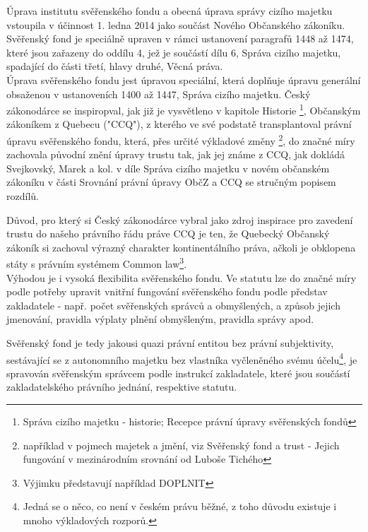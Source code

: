 \documentclass{article}
\begin{document}
Úprava institutu svěřenského fondu a obecná úprava správy cizího majetku vstoupila v účinnost 1. ledna 2014 jako součást Nového Občanského zákoníku. Svěřenský fond je speciálně upraven v rámci ustanovení paragrafů 1448 až 1474, které jsou zařazeny do oddílu 4, jež je součástí dílu 6, Správa cizího majetku, spadající do části třetí, hlavy druhé, Věcná práva. \\

Úprava svěřenského fondu jest úpravou speciální, která doplňuje úpravu generální obsaženou v ustanoveních 1400 až 1447, Správa cizího majetku. Český zákonodárce se inspiropval, jak již je vysvětleno v kapitole Historie \footnote{Správa cizího majetku - historie; Recepce právní úpravy svěřenských fondů}, Občanským zákoníkem z Quebecu ("CCQ"), z kterého ve své podstatě transplantoval právní úpravu svěřenského fondu, která, přes určité výkladové změny \footnote{například v pojmech majetek a jmění, viz Svěřenský fond a trust - Jejich fungování v mezinárodním srovnání od Luboše Tichého}, do značné míry zachovala původní znění úpravy trustu tak, jak jej známe z CCQ, jak dokládá Svejkovský, Marek a kol. v díle Správa cizího majetku v novém občanském zákoníku v části Srovnání právní úpravy ObčZ a CCQ se stručným popisem rozdílů. 

\newpage
\thispagestyle{smallertextinheader}

Důvod, pro který si Český zákonodárce vybral jako zdroj inspirace pro zavedení trustu do našeho právního řádu práve CCQ je ten, že Quebecký Občanský zákoník si zachoval výrazný charakter kontinentálního práva, ačkoli je obklopena státy s právním systémem Common law\footnote{Výjimku představují například DOPLNIT}.\\

Výhodou je i vysoká flexibilita svěřenského fondu. Ve statutu lze do značné míry podle potřeby upravit vnitřní fungování svěřenského fondu podle představ zakladatele - např. počet svěřenských správců a obmyšlených, a způsob jejich jmenování, pravidla výplaty plnění obmyšleným, pravidla správy apod.


Svěřenský fond je tedy jakousi quazi právní entitou bez právní subjektivity, sestávající se z autonomního majetku bez vlastníka vyčleněného svému účelu\footnote{Jedná se o něco, co není v českém právu běžné, z toho důvodu existuje i mnoho výkladových rozporů.}, je spravován svěřenským správcem podle instrukcí zakladatele, které jsou součástí zakladatelského právního jednání, respektive statutu.
\end{document}
